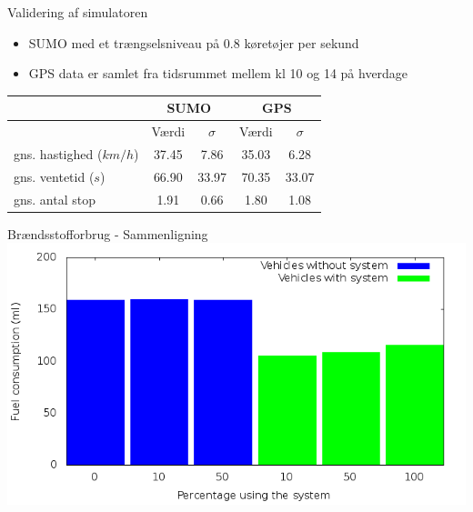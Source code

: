 \begin{frame}{Validering af simulatoren}

\begin{itemize}

\item SUMO med et trængselsniveau på 0.8 køretøjer per sekund
\item GPS data er samlet fra tidsrummet mellem kl 10 og 14 på hverdage
\end{itemize}

\centering
	\begin{tabular}{|l|c|c|c|c|}\hline
	 						&  \multicolumn{2}{c|}{SUMO} & \multicolumn{2}{c|}{GPS} \\\hline
	 						& Værdi & $\sigma$ & Værdi & $\sigma$ \\\hline
	gns. hastighed ($km/h$) 	& 37.45 & 7.86 	& 35.03 & 6.28 \\\hline
	gns. ventetid ($s$) & 66.90 & 33.97 & 70.35 & 33.07 \\\hline
	gns. antal stop 	& 1.91 	& 0.66 	& 1.80 	& 1.08 \\\hline
	\end{tabular}

\end{frame}

%

%

\begin{frame}{Brændsstofforbrug - Sammenligning}
\includegraphics[width=1\textwidth]{../images/tp0c0_8/combinedFuel.png}
\end{frame}

